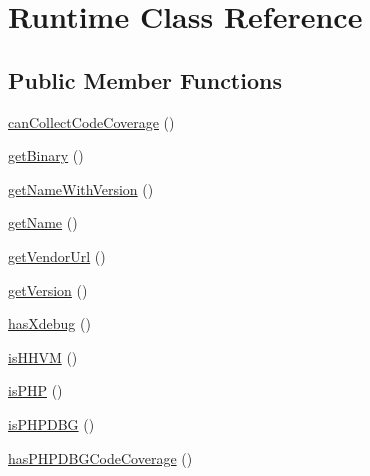 \hypertarget{class_sebastian_bergmann_1_1_environment_1_1_runtime}{}\section{Runtime Class Reference}
\label{class_sebastian_bergmann_1_1_environment_1_1_runtime}
\subsection*{Public Member Functions}
\begin{DoxyCompactItemize}
\item 
\mbox{\hyperlink{class_sebastian_bergmann_1_1_environment_1_1_runtime_a42325c04455b234a6fe2c82afeaf64ed}{can\+Collect\+Code\+Coverage}} ()
\item 
\mbox{\hyperlink{class_sebastian_bergmann_1_1_environment_1_1_runtime_a138a1d5494c18de73ffa2e00c3710dee}{get\+Binary}} ()
\item 
\mbox{\hyperlink{class_sebastian_bergmann_1_1_environment_1_1_runtime_a5fbc8183397fa91dc5a6ba4ea691249e}{get\+Name\+With\+Version}} ()
\item 
\mbox{\hyperlink{class_sebastian_bergmann_1_1_environment_1_1_runtime_a3d0963e68bb313b163a73f2803c64600}{get\+Name}} ()
\item 
\mbox{\hyperlink{class_sebastian_bergmann_1_1_environment_1_1_runtime_af4f72d653429fc10b3afe1bd6229e592}{get\+Vendor\+Url}} ()
\item 
\mbox{\hyperlink{class_sebastian_bergmann_1_1_environment_1_1_runtime_afa8e7a3a646144eab50188b7a805a389}{get\+Version}} ()
\item 
\mbox{\hyperlink{class_sebastian_bergmann_1_1_environment_1_1_runtime_acecff6f517895e8b29d0fa8c01719cad}{has\+Xdebug}} ()
\item 
\mbox{\hyperlink{class_sebastian_bergmann_1_1_environment_1_1_runtime_a143d62536771155bca50c9a3a2570fc9}{is\+H\+H\+VM}} ()
\item 
\mbox{\hyperlink{class_sebastian_bergmann_1_1_environment_1_1_runtime_ad8d8be550e6fd8c5cb85a0e2e4694775}{is\+P\+HP}} ()
\item 
\mbox{\hyperlink{class_sebastian_bergmann_1_1_environment_1_1_runtime_acf30ff73d108770a401801df1e1a7a2b}{is\+P\+H\+P\+D\+BG}} ()
\item 
\mbox{\hyperlink{class_sebastian_bergmann_1_1_environment_1_1_runtime_ac8e0875de214299bd91a0acd2e46ccea}{has\+P\+H\+P\+D\+B\+G\+Code\+Coverage}} ()
\end{DoxyCompactItemize}


